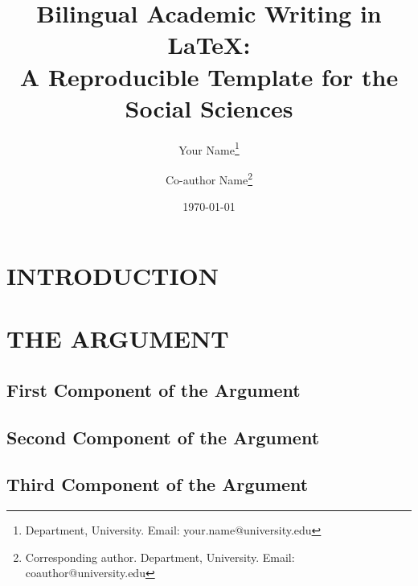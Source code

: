 \documentclass[12pt]{article}
\title{\textbf{Bilingual Academic Writing in \LaTeX:\\ A Reproducible Template for the Social Sciences}}
\author{
  Your Name\thanks{Department, University. Email: your.name@university.edu}
  \and
  Co-author Name\thanks{Corresponding author. Department, University. Email: coauthor@university.edu}
}
\date{\today}
\begin{document}
\maketitle

\begin{abstract}

\end{abstract}

\newpage


\section{INTRODUCTION}


\section{THE ARGUMENT}


\subsection{First Component of the Argument}
\label{sec:argument-part-1}


\subsection{Second Component of the Argument}
\label{sec:argument-part-2}


\subsection{Third Component of the Argument}
\label{sec:argument-part-3}

\end{document}
